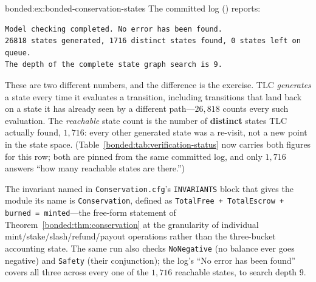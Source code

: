 \begin{pdSolution}{bonded:ex:bonded-conservation-states}
The committed log () reports:
\begin{lstlisting}
Model checking completed. No error has been found.
26818 states generated, 1716 distinct states found, 0 states left on queue.
The depth of the complete state graph search is 9.
\end{lstlisting}
These are two different numbers, and the difference is the exercise. TLC \emph{generates} a state every time it evaluates a transition, including transitions that land back on a state it has already seen by a different path---$26{,}818$ counts every such evaluation. The \emph{reachable} state count is the number of \textbf{distinct} states TLC actually found, $1{,}716$: every other generated state was a re-visit, not a new point in the state space. (Table~\ref{bonded:tab:verification-status} now carries both figures for this row; both are pinned from the same committed log, and only $1{,}716$ answers ``how many reachable states are there.'')

The invariant named in \texttt{Conservation.cfg}'s \texttt{INVARIANTS} block that gives the module its name is \texttt{Conservation}, defined as \texttt{TotalFree + TotalEscrow + burned = minted}---the free-form statement of Theorem~\ref{bonded:thm:conservation} at the granularity of individual mint/stake/slash/refund/payout operations rather than the three-bucket accounting state. The same run also checks \texttt{NoNegative} (no balance ever goes negative) and \texttt{Safety} (their conjunction); the log's ``No error has been found'' covers all three across every one of the $1{,}716$ reachable states, to search depth $9$.
\end{pdSolution}
